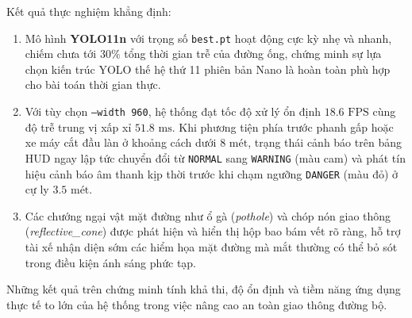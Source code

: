 Kết quả thực nghiệm khẳng định:
\begin{enumerate}
    \item Mô hình \textbf{YOLO11n} với trọng số \texttt{best.pt} hoạt động cực kỳ nhẹ và nhanh, chiếm chưa tới $30\%$ tổng thời gian trễ của đường ống, chứng minh sự lựa chọn kiến trúc YOLO thế hệ thứ 11 phiên bản Nano là hoàn toàn phù hợp cho bài toán thời gian thực.
    \item Với tùy chọn \texttt{--width 960}, hệ thống đạt tốc độ xử lý ổn định $18.6\text{ FPS}$ cùng độ trễ trung vị xấp xỉ $51.8\text{ ms}$. Khi phương tiện phía trước phanh gấp hoặc xe máy cắt đầu làn ở khoảng cách dưới $8\text{ mét}$, trạng thái cảnh báo trên bảng HUD ngay lập tức chuyển đổi từ \texttt{NORMAL} sang \texttt{WARNING} (màu cam) và phát tín hiệu cảnh báo âm thanh kịp thời trước khi chạm ngưỡng \texttt{DANGER} (màu đỏ) ở cự ly $3.5\text{ mét}$.
    \item Các chướng ngại vật mặt đường như ổ gà (\textit{pothole}) và chóp nón giao thông (\textit{reflective\_cone}) được phát hiện và hiển thị hộp bao bám vết rõ ràng, hỗ trợ tài xế nhận diện sớm các hiểm họa mặt đường mà mắt thường có thể bỏ sót trong điều kiện ánh sáng phức tạp.
\end{enumerate}

Những kết quả trên chứng minh tính khả thi, độ ổn định và tiềm năng ứng dụng thực tế to lớn của hệ thống trong việc nâng cao an toàn giao thông đường bộ.
